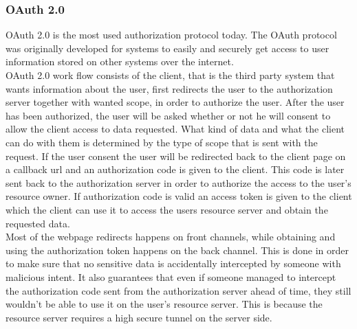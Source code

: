 \subsubsection{OAuth 2.0}
OAuth 2.0\cite{oauthvideo} is the most used authorization protocol today. The OAuth protocol was originally developed for systems to easily and securely get access to user information stored on other systems over the internet.
\\[11pt]
OAuth 2.0 work flow consists of the client, that is the third party system that wants information about the user, first redirects the user to the authorization server together with wanted scope, in order to authorize the user. After the user has been authorized, the user will be asked whether or not he will consent to allow the client access to data requested. What kind of data and what the client can do with them is determined by the type of scope that is sent with the request. If the user consent the user will be redirected back to the client page on a callback url and an authorization code is given to the client. This code is later sent back to the authorization server in order to authorize the access to the user's resource owner. If authorization code is valid an access token is given to the client which the client can use it to access the users resource server and obtain the requested data.
\\[11pt]
Most of the webpage redirects happens on front channels, while obtaining and using the authorization token happens on the back channel. This is done in order to make sure that no sensitive data is accidentally intercepted by someone with malicious intent. It also guarantees that even if someone managed to intercept the authorization code sent from the authorization server ahead of time, they still wouldn't be able to use it on the user's resource server. This is because the resource server requires a high secure tunnel on the server side.